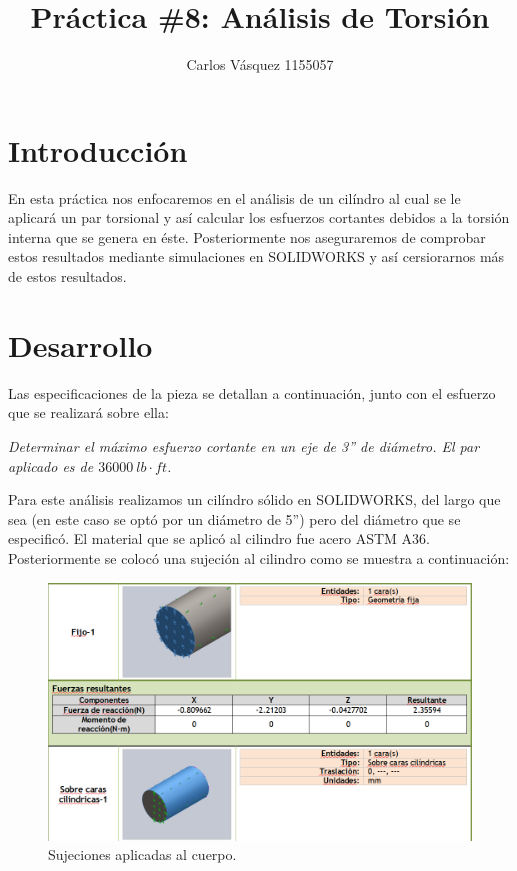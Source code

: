 \documentclass[12pt, letterpaper]{article}
\title{Práctica \#8: Análisis de Torsión}
\author{Carlos Vásquez 1155057}
\begin{document}
\maketitle
\section*{Introducción}
En esta práctica nos enfocaremos en el análisis de un cilíndro al cual se le aplicará un par torsional y así calcular los esfuerzos cortantes debidos a la torsión interna que se genera en éste. Posteriormente nos aseguraremos de comprobar estos resultados mediante simulaciones en SOLIDWORKS y así cersiorarnos más de estos resultados.

\section*{Desarrollo}

Las especificaciones de la pieza se detallan a continuación, junto con el esfuerzo que se realizará sobre ella:

\textit{Determinar el máximo esfuerzo cortante en un eje de 3'' de diámetro. El par aplicado es de $36000\ lb \cdot ft$.}

Para este análisis realizamos un cilíndro sólido en SOLIDWORKS, del largo que sea (en este caso se optó por un diámetro de 5'') pero del diámetro que se especificó. El material que se aplicó al cilindro fue acero ASTM A36. Posteriormente se colocó una sujeción al cilindro como se muestra a continuación:

\begin{figure}[H]
	\centering
	\includegraphics[width=\textwidth]{sujeciones.png}
	\caption{Sujeciones aplicadas al cuerpo.}
\end{figure}
\end{document}

